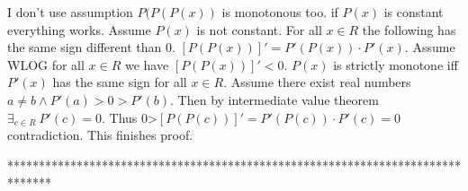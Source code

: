 \begin{solution}
	I don't use assumption $P(P(P(x))$ is monotonous too. if $P(x)$ is constant everything works. Assume $P(x)$ is not constant. For all $x \in R$ the following has the same sign different than $0$.
$[P(P(x))]'= P'(P(x))\cdot P'(x)$.
Assume WLOG for all $x\in R$ we have $[P(P(x))]'<0$. $P(x)$ is strictly monotone iff $P'(x)$ has the same sign for all $x\in R$. Assume there exist real numbers $a\neq b\wedge P'(a)>0>P'(b)$. Then by intermediate value theorem $\exists_{c\in R} \ P'(c) =0$. Thus 0>$[P(P(c))]'= P'(P(c))\cdot P'(c)=0$ contradiction. This finishes proof.
\end{solution}



*******************************************************************************
